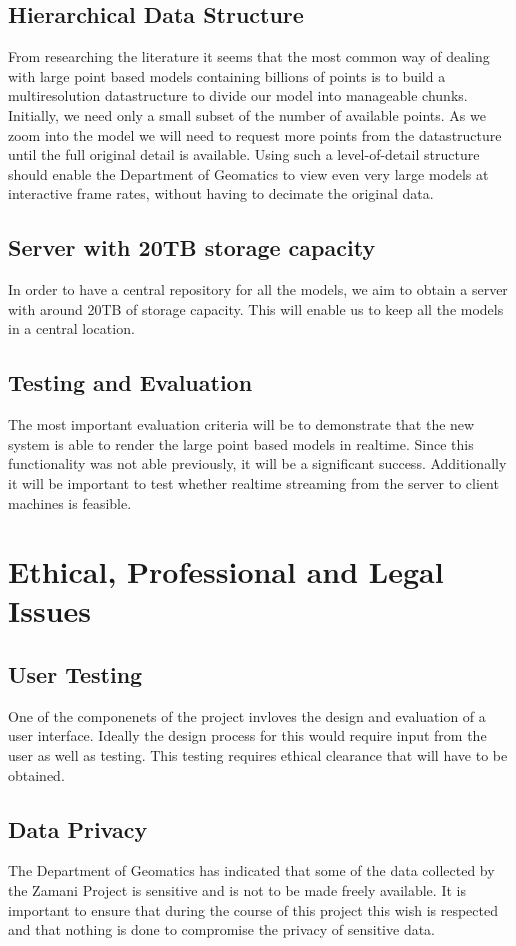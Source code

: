 \documentclass[12pt,a4paper]{article}
\begin{document}
\subsection{Hierarchical Data Structure}
From researching the literature it seems that the most common way of dealing
with large point based models containing billions of points is to build a
multiresolution datastructure to divide our model into manageable chunks.
Initially, we need only a small subset of the number of available points.
As we zoom into the model we will need to request more points from the
datastructure until the full original detail is available. Using such a
level-of-detail structure should enable the Department of Geomatics to
view even very large models at interactive frame rates, without having
to decimate the original data.
\subsection{Server with 20TB storage capacity}
In order to have a central repository for all the models, we aim to obtain a server
with around 20TB of storage capacity. This will enable us to keep all the models in
a central location.
\subsection{Testing and Evaluation}
The most important evaluation criteria will be to demonstrate that the new
system is able to render the large point based models in realtime. Since this
functionality was not able previously, it will be a significant success.
Additionally it will be important to test whether realtime streaming from the
server to client machines is feasible.

\section{Ethical, Professional and Legal Issues}
\subsection{User Testing}
One of the componenets of the project invloves the design and evaluation
of a user interface. Ideally the design process for this would require
input from the user as well as testing. This testing requires ethical clearance
that will have to be obtained.
\subsection{Data Privacy}
The Department of Geomatics has indicated that some of the data collected by
the Zamani Project is sensitive and is not to be made freely available. It is
important to ensure that during the course of this project this wish is respected
and that nothing is done to compromise the privacy of sensitive data.
\end{document}
